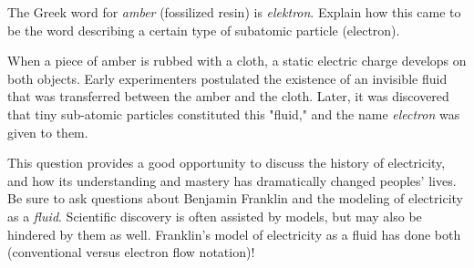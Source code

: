 

The Greek word for {\it amber} (fossilized resin) is {\it elektron}.  Explain how this came to be the word describing a certain type of subatomic particle (electron).







When a piece of amber is rubbed with a cloth, a static electric charge develops on both objects.  Early experimenters postulated the existence of an invisible fluid that was transferred between the amber and the cloth.  Later, it was discovered that tiny sub-atomic particles constituted this "fluid," and the name {\it electron} was given to them.







This question provides a good opportunity to discuss the history of electricity, and how its understanding and mastery has dramatically changed peoples' lives.  Be sure to ask questions about Benjamin Franklin and the modeling of electricity as a {\it fluid}.  Scientific discovery is often assisted by models, but may also be hindered by them as well.  Franklin's model of electricity as a fluid has done both (conventional versus electron flow notation)!




